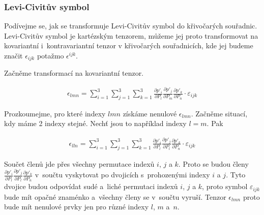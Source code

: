 \subsubsection{Levi-Civitův symbol}

Podívejme se, jak se transformuje Levi-Civitův symbol do křivočarých souřadnic. Levi-Civitův symbol je kartézským tenzorem, můžeme jej proto transformovat na kovariantní i~kontravariantní tenzor v křivočarých souřadnicích, kde jej budeme značit \(\epsilon_{ijk}\) potažmo \(\epsilon^{ijk}\).

Začněme transformací na kovariantní tenzor. 

\begin{equation}
\begin{split}
\epsilon_{lmn} = \sum_{i=1}^3 \sum_{j=1}^3 \sum_{k=1}^3 \frac{\partial p'_i}{\partial P_l} \frac{\partial p'_j}{\partial P_m} \frac{\partial p'_k}{\partial P_n} \cdot \varepsilon_{ijk}
\end{split}
\end{equation}

Prozkoumejme, pro které indexy \(lmn\) získáme nenulové \(\epsilon_{lmn}\). Začněme situací, kdy máme 2 indexy stejné. Nechť jsou to například indexy \(l = m\). Pak

\begin{equation}
\begin{split}
\epsilon_{lln} = \sum_{i=1}^3 \sum_{j=1}^3 \sum_{k=1}^3 \frac{\partial p'_i}{\partial P_l} \frac{\partial p'_j}{\partial P_l} \frac{\partial p'_k}{\partial P_n} \cdot \varepsilon_{ijk}
\end{split}
\end{equation}

Součet členů jde přes všechny permutace indexů \(i\), \(j\) a \(k\). Proto se budou členy \(\frac{\partial p'_i}{\partial P_l} \frac{\partial p'_j}{\partial P_l} \frac{\partial p'_k}{\partial P_n}\) v~součtu vyskytovat po dvojicích s~prohozenými indexy \(i\) a \(j\). Tyto dvojice budou odpovídat sudé a~liché permutaci indexů \(i\), \(j\) a \(k\), proto symbol \(\varepsilon_{ijk}\) bude mít opačné znaménko a~všechny členy se v~součtu vyruší. Tenzor \(\epsilon_{lmn}\) proto bude mít nenulové prvky jen pro různé indexy \(l\), \(m\) a~\(n\).

